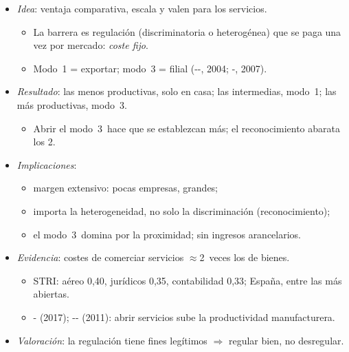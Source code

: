 \documentclass{article}
\begin{document}
\begin{columnas}
\begin{itemize}
\item \emph{Idea}: ventaja comparativa, escala y  valen para los servicios.
  \begin{itemize}
  \item La barrera es regulación (discriminatoria o heterogénea) que se paga una vez por mercado: \emph{coste fijo}.
  \item Modo~1 = exportar; modo~3 = filial (--, 2004; -, 2007).
  \end{itemize}
\item \emph{Resultado}: las menos productivas, solo en casa; las intermedias, modo~1; las más productivas, modo~3.
  \begin{itemize}
  \item Abrir el modo~3~hace que se establezcan más; el reconocimiento abarata los 2.
  \end{itemize}
\item \emph{Implicaciones}:
  \begin{itemize}
  \item margen extensivo: pocas empresas, grandes;
  \item importa la heterogeneidad, no solo la discriminación (reconocimiento);
  \item el modo~3~domina por la proximidad; sin ingresos arancelarios.
  \end{itemize}
\item \emph{Evidencia}: costes de comerciar servicios $\approx$2~veces los de bienes.
  \begin{itemize}
  \item STRI: aéreo 0,40, jurídicos 0,35, contabilidad 0,33; España, entre las más abiertas.
  \item {}- (2017); -- (2011): abrir servicios sube la productividad manufacturera.
  \end{itemize}
\item \emph{Valoración}: la regulación tiene fines legítimos $\Rightarrow$ regular bien, no desregular.
\end{itemize}


\end{columnas}
\end{document}
